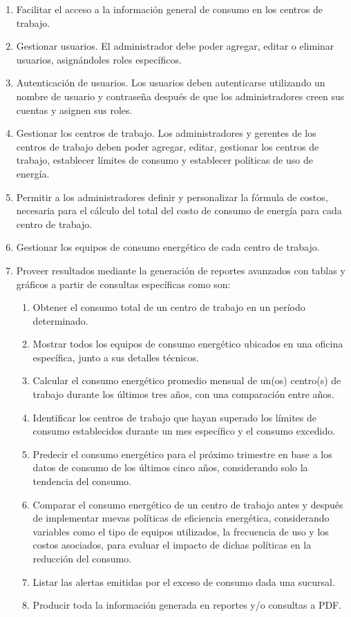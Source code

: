 \documentclass{article}
\begin{document}
\begin{enumerate}
\item Facilitar el acceso a la información general de consumo en los centros de trabajo.
\item Gestionar usuarios. El administrador debe poder agregar, editar o eliminar usuarios, asignándoles roles específicos.
\item Autenticación de usuarios. Los usuarios deben autenticarse utilizando un nombre de usuario y contraseña después de que
los administradores creen sus cuentas y asignen sus roles.
\item Gestionar los centros de trabajo. Los administradores y gerentes de los centros de trabajo deben poder agregar, editar, gestionar los centros de trabajo, establecer límites de consumo y establecer políticas de uso de energía.
\item Permitir a los administradores definir y personalizar la fórmula de costos, necesaria para el cálculo del total del costo de consumo de energía para cada centro de trabajo.
\item Gestionar los equipos de consumo energético de cada centro de trabajo. 
\item Proveer resultados mediante la generación de reportes avanzados con tablas y gráficos a partir de consultas específicas como son:
\begin{enumerate}
\item Obtener el consumo total de un centro de trabajo en un período determinado.
\item Mostrar todos los equipos de consumo energético ubicados en una oficina específica, junto a sus detalles técnicos.
\item Calcular el consumo energético promedio mensual de un(os) centro(s) de trabajo durante los últimos tres años, con una comparación entre años.
\item Identificar los centros de trabajo que hayan superado los límites de consumo establecidos durante un mes específico y el consumo excedido.
\item Predecir el consumo energético para el próximo trimestre en base a los datos de consumo de los últimos cinco años, considerando solo la tendencia del consumo.
\item Comparar el consumo energético de un centro de trabajo antes y después de implementar nuevas políticas de eficiencia energética, considerando variables como el tipo de equipos utilizados, la frecuencia de uso y los costos asociados, para evaluar el impacto de dichas políticas en la reducción del consumo.
\item Listar las alertas emitidas por el exceso de consumo dada una sucursal.
\item Producir toda la información generada en reportes y/o consultas a PDF.
\end{enumerate}
\end{enumerate}
\end{document}
